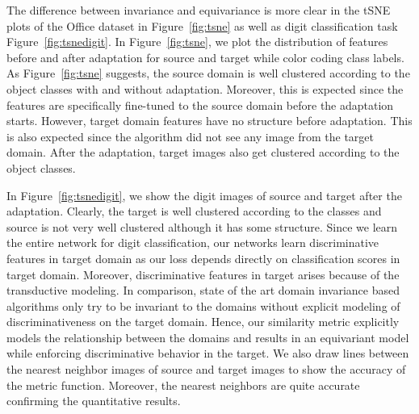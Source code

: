 The difference between invariance and equivariance is more clear in the tSNE plots of the Office dataset in Figure~\ref{fig:tsne} as well as digit classification task Figure~\ref{fig:tsnedigit}. In Figure~\ref{fig:tsne}, we plot the distribution of features before and after adaptation for source and target while color coding class labels. As Figure~\ref{fig:tsne} suggests, the source domain is well clustered according to the object classes with and without adaptation. Moreover, this is expected since the features are specifically fine-tuned to the source domain before the adaptation starts. However, target domain features have no structure before adaptation. This is also expected since the algorithm did not see any image from the target domain. After the adaptation, target images also get clustered according to the object classes. 

In Figure~\ref{fig:tsnedigit}, we show the digit images of source and target after the adaptation. Clearly, the target is well clustered according to the classes and source is not very well clustered although it has some structure. Since we learn the entire network for digit classification, our networks learn discriminative features in target domain as our loss depends directly on classification scores in target domain. Moreover, discriminative features in target arises because of the transductive modeling. In comparison, state of the art domain invariance based algorithms only try to be invariant to the domains without explicit modeling of discriminativeness on the target domain. Hence, our similarity metric explicitly models the relationship between the domains and results in an equivariant model while enforcing discriminative behavior in the target. We also draw lines between the nearest neighbor images of source and target images to show the accuracy of the metric function. Moreover, the nearest neighbors are quite accurate confirming the quantitative results. 

